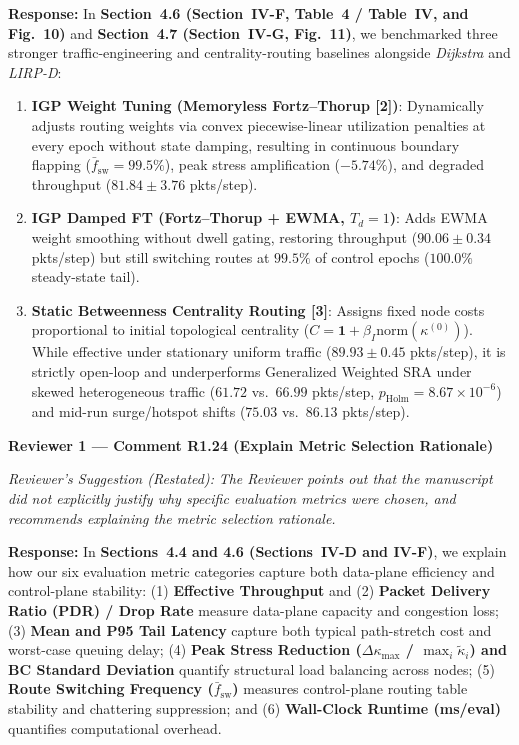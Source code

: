 \documentclass[11pt,a4paper]{article}
\newcommand{\cbox}[2]{%
  \vspace{0.6em}\noindent\textbf{#1}\par\smallskip
  \noindent\textit{Reviewer's Suggestion (Restated):} \textit{#2}\par\smallskip
}
\begin{document}
\noindent\textbf{Response:} In \textbf{Section~4.6 (Section~IV-F, Table~4 / Table~IV, and Fig.~10)} and \textbf{Section~4.7 (Section~IV-G, Fig.~11)}, we benchmarked three stronger traffic-engineering and centrality-routing baselines alongside \textit{Dijkstra} and \textit{LIRP-D}:
\begin{enumerate}[leftmargin=1.8em]
    \item \textbf{IGP Weight Tuning (Memoryless Fortz--Thorup [2])}: Dynamically adjusts routing weights via convex piecewise-linear utilization penalties at every epoch without state damping, resulting in continuous boundary flapping ($\bar{f}_{\text{sw}} = 99.5\%$), peak stress amplification ($-5.74\%$), and degraded throughput ($81.84 \pm 3.76$ pkts/step).
    \item \textbf{IGP Damped FT (Fortz--Thorup + EWMA, $T_d=1$)}: Adds EWMA weight smoothing without dwell gating, restoring throughput ($90.06 \pm 0.34$ pkts/step) but still switching routes at $99.5\%$ of control epochs ($100.0\%$ steady-state tail).
    \item \textbf{Static Betweenness Centrality Routing [3]}: Assigns fixed node costs proportional to initial topological centrality ($C = \mathbf{1} + \beta_I\mathrm{norm}(\kappa^{(0)})$). While effective under stationary uniform traffic ($89.93 \pm 0.45$ pkts/step), it is strictly open-loop and underperforms Generalized Weighted SRA under skewed heterogeneous traffic ($61.72$ vs.\ $66.99$ pkts/step, $p_{\text{Holm}}=8.67\times 10^{-6}$) and mid-run surge/hotspot shifts ($75.03$ vs.\ $86.13$ pkts/step).
\end{enumerate}

\hrulefill

\cbox{Reviewer 1 --- Comment R1.24 (Explain Metric Selection Rationale)}{The Reviewer points out that the manuscript did not explicitly justify why specific evaluation metrics were chosen, and recommends explaining the metric selection rationale.}

\noindent\textbf{Response:} In \textbf{Sections~4.4 and 4.6 (Sections~IV-D and IV-F)}, we explain how our six evaluation metric categories capture both data-plane efficiency and control-plane stability: (1) \textbf{Effective Throughput} and (2) \textbf{Packet Delivery Ratio (PDR) / Drop Rate} measure data-plane capacity and congestion loss; (3) \textbf{Mean and P95 Tail Latency} capture both typical path-stretch cost and worst-case queuing delay; (4) \textbf{Peak Stress Reduction ($\Delta\kappa_{\max}$ / $\max_i\widetilde{\kappa}_i$) and BC Standard Deviation} quantify structural load balancing across nodes; (5) \textbf{Route Switching Frequency ($\bar{f}_{\text{sw}}$)} measures control-plane routing table stability and chattering suppression; and (6) \textbf{Wall-Clock Runtime (ms/eval)} quantifies computational overhead.
\end{document}
